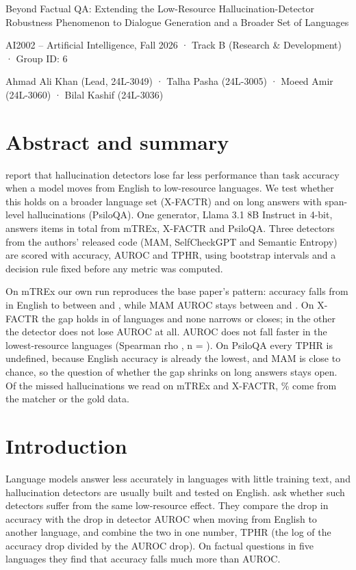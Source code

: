 \documentclass[12pt]{article}
\begin{document}
{\headfont\fontsize{24bp}{28.8bp}\selectfont Beyond Factual QA: Extending the Low-Resource Hallucination-Detector Robustness Phenomenon to Dialogue Generation and a Broader Set of Languages\par}
\vspace{18bp}\nopagebreak
{\setlength{\parskip}{6.75bp}
AI2002 – Artificial Intelligence, Fall 2026 · Track B (Research \& Development) · Group ID: 6\par
Ahmad Ali Khan (Lead, 24L-3049) · Talha Pasha (24L-3005) · Moeed Amir (24L-3060) · Bilal Kashif (24L-3036)\par}

\section{Abstract and summary}
\citet{datta2026} report that hallucination detectors lose far less performance than task accuracy when a model moves from English to low-resource languages. We test whether this holds on a broader language set (X-FACTR) and on long answers with span-level hallucinations (PsiloQA). One generator, Llama 3.1 8B Instruct in 4-bit, answers \totalitems{} items in total from mTREx, X-FACTR and PsiloQA. Three detectors from the authors' released code (MAM, SelfCheckGPT and Semantic Entropy) are scored with accuracy, AUROC and TPHR, using bootstrap intervals and a decision rule fixed before any metric was computed.

On mTREx our own run reproduces the base paper's pattern: accuracy falls from \mtenacc{} in English to between \mtacclo{} and \mtacchi{}, while MAM AUROC stays between \mtfclo{} and \mtfchi{}. On X-FACTR the gap holds in \xfholdsn{} of \xfn{} languages and none narrows or closes; in the other \xfundefn{} the detector does not lose AUROC at all. AUROC does not fall faster in the lowest-resource languages (Spearman rho \rhoau{}, n = \nsp{}). On PsiloQA every TPHR is undefined, because English accuracy is already the lowest, and MAM is close to chance, so the question of whether the gap shrinks on long answers stays open. Of the \errmissn{} missed hallucinations we read on mTREx and X-FACTR, \errmissnoisepct\% come from the matcher or the gold data.

\section{Introduction}
Language models answer less accurately in languages with little training text, and hallucination detectors are usually built and tested on English. \citet{datta2026} ask whether such detectors suffer from the same low-resource effect. They compare the drop in accuracy with the drop in detector AUROC when moving from English to another language, and combine the two in one number, TPHR (the log of the accuracy drop divided by the AUROC drop). On factual questions in five languages they find that accuracy falls much more than AUROC.
\end{document}
